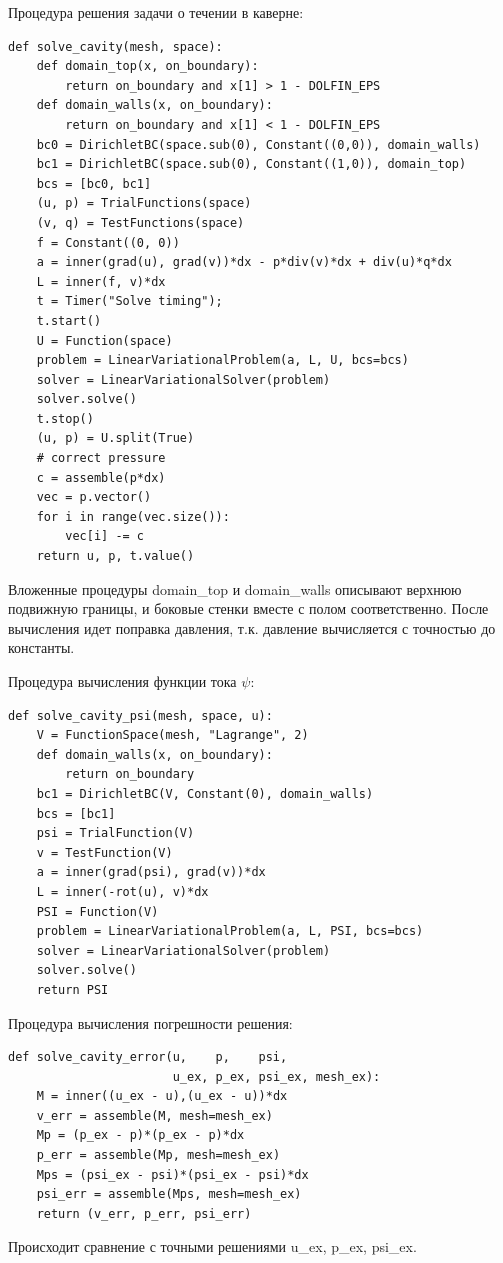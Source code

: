 \documentclass[12pt]{article}
\begin{document}
Процедура решения задачи о течении в каверне: 
\begin{lstlisting}       
def solve_cavity(mesh, space):
    def domain_top(x, on_boundary):
        return on_boundary and x[1] > 1 - DOLFIN_EPS  
    def domain_walls(x, on_boundary):
        return on_boundary and x[1] < 1 - DOLFIN_EPS    
    bc0 = DirichletBC(space.sub(0), Constant((0,0)), domain_walls)
    bc1 = DirichletBC(space.sub(0), Constant((1,0)), domain_top)
    bcs = [bc0, bc1]    
    (u, p) = TrialFunctions(space)
    (v, q) = TestFunctions(space)
    f = Constant((0, 0))       
    a = inner(grad(u), grad(v))*dx - p*div(v)*dx + div(u)*q*dx
    L = inner(f, v)*dx    
    t = Timer("Solve timing");
    t.start()            
    U = Function(space)
    problem = LinearVariationalProblem(a, L, U, bcs=bcs)
    solver = LinearVariationalSolver(problem)
    solver.solve()    
    t.stop()    
    (u, p) = U.split(True)        
    # correct pressure
    c = assemble(p*dx)
    vec = p.vector()
    for i in range(vec.size()):
        vec[i] -= c
    return u, p, t.value()
\end{lstlisting}
Вложенные процедуры domain\_top и domain\_walls описывают верхнюю подвижную границы, и боковые стенки вместе с полом соответственно. После вычисления идет поправка давления, т.к. давление вычисляется с точностью до константы.

Процедура вычисления функции тока $\psi$:
\begin{lstlisting}
def solve_cavity_psi(mesh, space, u):
    V = FunctionSpace(mesh, "Lagrange", 2)
    def domain_walls(x, on_boundary):
        return on_boundary
    bc1 = DirichletBC(V, Constant(0), domain_walls)    
    bcs = [bc1]
    psi = TrialFunction(V)
    v = TestFunction(V)    
    a = inner(grad(psi), grad(v))*dx
    L = inner(-rot(u), v)*dx    
    PSI = Function(V)
    problem = LinearVariationalProblem(a, L, PSI, bcs=bcs)
    solver = LinearVariationalSolver(problem)
    solver.solve()
    return PSI
\end{lstlisting}

Процедура вычисления погрешности решения:
\begin{lstlisting}
def solve_cavity_error(u,    p,    psi,    
                       u_ex, p_ex, psi_ex, mesh_ex):
    M = inner((u_ex - u),(u_ex - u))*dx
    v_err = assemble(M, mesh=mesh_ex)    
    Mp = (p_ex - p)*(p_ex - p)*dx
    p_err = assemble(Mp, mesh=mesh_ex)
    Mps = (psi_ex - psi)*(psi_ex - psi)*dx
    psi_err = assemble(Mps, mesh=mesh_ex)
    return (v_err, p_err, psi_err)
\end{lstlisting}
Происходит сравнение с точными решениями u\_ex, p\_ex, psi\_ex.
\end{document}
